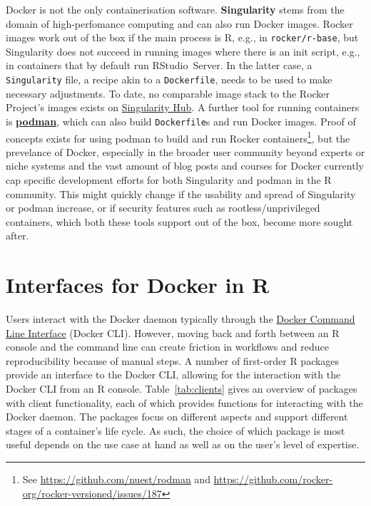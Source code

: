 Docker is not the only containerisation software. \textbf{Singularity}
stems from the domain of high-perfomance computing
\citep{kurtzer_singularity_2017} and can also run Docker images. Rocker
images work out of the box if the main process is R, e.g., in
\texttt{rocker/r-base}, but Singularity does not succeed in running
images where there is an init script, e.g., in containers that by
default run RStudio~Server. In the latter case, a \texttt{Singularity}
file, a recipe akin to a \texttt{Dockerfile}, needs to be used to make
necessary adjustments. To date, no comparable image stack to the Rocker
Project's images exists on
\href{https://singularity-hub.org/}{Singularity Hub}. A further tool for
running containers is
\href{https://github.com/containers/libpod}{\textbf{podman}}, which can
also build \texttt{Dockerfile}s and run Docker images. Proof of concepts
exists for using podman to build and run Rocker
containers\footnote{See \href{https://github.com/nuest/rodman}{https://github.com/nuest/rodman} and \href{https://github.com/rocker-org/rocker-versioned/issues/187}{https://github.com/rocker-org/rocker-versioned/issues/187}},
but the prevelance of Docker, especially in the broader user community
beyond experts or niche systems and the vast amount of blog posts and
courses for Docker currently cap specific development efforts for both
Singularity and podman in the R community. This might quickly change if
the usability and spread of Singularity or podman increase, or if
security features such as rootless/unprivileged containers, which both
these tools support out of the box, become more sought after.

\hypertarget{interfaces-for-docker-in-r}{%
\section{Interfaces for Docker in R}\label{interfaces-for-docker-in-r}}

\label{interfaces}

Users interact with the Docker daemon typically through the
\href{https://docs.docker.com/engine/reference/commandline/cli/}{Docker
Command Line Interface} (Docker CLI). However, moving back and forth
between an R console and the command line can create friction in
workflows and reduce reproducibility because of manual steps. A number
of first-order R packages provide an interface to the Docker CLI,
allowing for the interaction with the Docker CLI from an R console.
Table~\ref{tab:clients} gives an overview of packages with client
functionality, each of which provides functions for interacting with the
Docker daemon. The packages focus on different aspects and support
different stages of a container's life cycle. As such, the choice of
which package is most useful depends on the use case at hand as well as
on the user's level of expertise.

